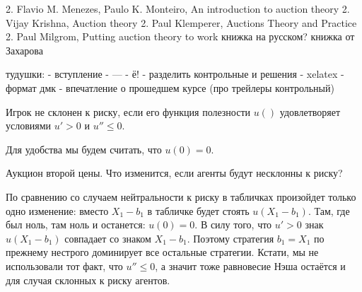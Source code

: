 2.	Flavio M. Menezes, Paulo K. Monteiro, An introduction to auction theory
2.	Vijay Krishna, Auction theory
2.	Paul Klemperer, Auctions Theory and Practice
2.	Paul Milgrom, Putting auction theory to work
книжка на русском?
книжка от Захарова

тудушки:
- вступление
- ---
- ё!
- разделить контрольные и решения
- xelatex
- формат дмк
- впечатление о прошедшем курсе (про трейлеры контрольный)



\begin{mydef}
Игрок не склонен к риску, если его функция полезности $ u() $ удовлетворяет условиями $ u'>0 $ и $ u''\leq 0 $.
\end{mydef}

Для удобства мы будем считать, что $ u(0)=0 $.

Аукцион второй цены. Что изменится, если агенты будут несклонны к риску?

По сравнению со случаем нейтральности к риску в табличках произойдет только одно изменение: вместо $ X_{1}-b_{1} $ в табличке будет стоять $ u(X_{1}-b_{1}) $. Там, где был ноль, там ноль и останется: $ u(0)=0 $. В силу того, что $ u'>0 $ знак $ u(X_{1}-b_{1}) $ совпадает со знаком $ X_{1}-b_{1} $. Поэтому стратегия $ b_{1}=X_{1} $ по прежнему нестрого доминирует все остальные стратегии. Кстати, мы не использовали  тот факт, что $u''\leq 0 $, а значит тоже равновесие Нэша остаётся и для случая склонных к риску агентов.
